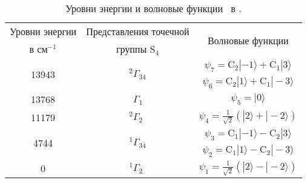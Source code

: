 \begin{table} [htbp]%
	\centering
	\begin{threeparttable}%
		\caption{Уровни энергии и волновые функции \niIon\ в \nbo.}%
		\label{tab:NiEnAndWf}%
		\begin{SingleSpace}
			\begin{tabular}{| c | c | c |}
				\hline 
				Уровни энергии & Представления точечной & \multirow{2}{*}{Волновые функции} \\ 
				в см$^{-1}$ & группы $\mathrm{S}_{4}$ &  \\ 
				\hline 
				\multirow{2}{*}{13943} & \multirow{2}{*}{${ }^{2} \Gamma_{34}$} & $\psi_{7}=\mathrm{C}_{2}|-1\rangle+\mathrm{C}_{1}|3\rangle$ \\
				& & $\psi_{6}=\mathrm{C}_{2}|1\rangle+\mathrm{C}_{1}|-3\rangle$ \\
				\hline
				13768 & $\phantom{{ }^{2} }\Gamma_{1\phantom{4}}$ & $\psi_{5}=|0\rangle$ \\
				\hline
				11179 & ${ }^{2} \Gamma_{2\phantom{4}}$ & $\psi_{4}=\frac{1}{\sqrt{2}}(|2\rangle+|-2\rangle)$ \\
				\hline
				\multirow{2}{*}{4744} & \multirow{2}{*}{${ }^{1} \Gamma_{34}$} & $\psi_{3}=\mathrm{C}_{1}|-1\rangle-\mathrm{C}_{2}|3\rangle$ \\
				& & $\psi_{2}=\mathrm{C}_{1}|1\rangle-\mathrm{C}_{2}|-3\rangle$ \\
				\hline 0 & ${ }^{1} \Gamma_{2\phantom{4}}$ & $\psi_{1}=\frac{1}{\sqrt{2}}(|2\rangle-|-2\rangle)$ \\
				\hline
			\end{tabular}%
		\end{SingleSpace}
	\end{threeparttable}
\end{table}

